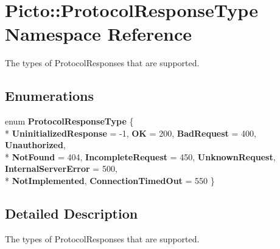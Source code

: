 \hypertarget{namespace_picto_1_1_protocol_response_type}{\section{Picto\-:\-:Protocol\-Response\-Type Namespace Reference}
\label{namespace_picto_1_1_protocol_response_type}
}


The types of Protocol\-Responses that are supported.  


\subsection*{Enumerations}
\begin{DoxyCompactItemize}
\item 
enum {\bfseries Protocol\-Response\-Type} \{ \\*
{\bfseries Uninitialized\-Response} = -\/1, 
{\bfseries O\-K} = 200, 
{\bfseries Bad\-Request} = 400, 
{\bfseries Unauthorized}, 
\\*
{\bfseries Not\-Found} = 404, 
{\bfseries Incomplete\-Request} = 450, 
{\bfseries Unknown\-Request}, 
{\bfseries Internal\-Server\-Error} = 500, 
\\*
{\bfseries Not\-Implemented}, 
{\bfseries Connection\-Timed\-Out} = 550
 \}
\end{DoxyCompactItemize}


\subsection{Detailed Description}
The types of Protocol\-Responses that are supported. 